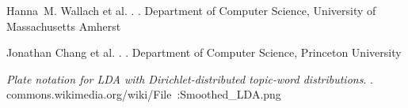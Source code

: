 \begin{thebibliography}{}

Hanna~M. Wallach et al.
.
.
\newblock Department of Computer Science, University of Massachusetts Amherst

Jonathan Chang et al.
.
.
\newblock Department of Computer Science, Princeton University

{\em Plate notation for LDA with Dirichlet-distributed topic-word distributions}.
.
\newblock commons.wikimedia.org/wiki/File~:Smoothed\_LDA.png
\end{thebibliography}